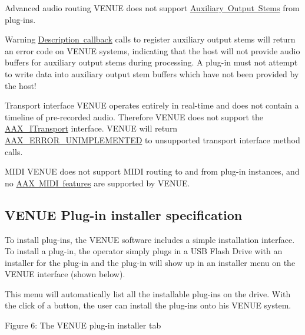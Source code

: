 
\begin{DoxyItemize}
\item Advanced audio routing  V\+E\+N\+UE does not support \mbox{\hyperlink{a00809}{Auxiliary Output Stems}} from plug-\/ins.

\begin{DoxyWarning}{Warning}
\mbox{\hyperlink{a00796}{Description callback}} calls to register auxiliary output stems will return an error code on V\+E\+N\+UE systems, indicating that the host will not provide audio buffers for auxiliary output stems during processing. A plug-\/in must not attempt to write data into auxiliary output stem buffers which have not been provided by the host!  
\end{DoxyWarning}

\item Transport interface  V\+E\+N\+UE operates entirely in real-\/time and does not contain a timeline of pre-\/recorded audio. Therefore V\+E\+N\+UE does not support the \mbox{\hyperlink{a01885}{A\+A\+X\+\_\+\+I\+Transport}} interface. V\+E\+N\+UE will return \mbox{\hyperlink{a00494_a5f8c7439f3a706c4f8315a9609811937a3b76994b32b97fcd56b19ef8032245df}{A\+A\+X\+\_\+\+E\+R\+R\+O\+R\+\_\+\+U\+N\+I\+M\+P\+L\+E\+M\+E\+N\+T\+ED}} to unsupported transport interface method calls.  
\item M\+I\+DI  V\+E\+N\+UE does not support M\+I\+DI routing to and from plug-\/in instances, and no \mbox{\hyperlink{a00806}{A\+AX M\+I\+DI features}} are supported by V\+E\+N\+UE.  
\end{DoxyItemize}



 \hypertarget{a00849_aax_venue_guide__installer}{}\subsection{V\+E\+N\+U\+E Plug-\/in installer specification}\label{a00849_aax_venue_guide__installer}
 To install plug-\/ins, the V\+E\+N\+UE software includes a simple installation interface. To install a plug-\/in, the operator simply plugs in a U\+SB Flash Drive with an installer for the plug-\/in and the plug-\/in will show up in an installer menu on the V\+E\+N\+UE interface (shown below).

 This menu will automatically list all the installable plug-\/ins on the drive. With the click of a button, the user can install the plug-\/ins onto his V\+E\+N\+UE system.

  Figure 6\+: The V\+E\+N\+UE plug-\/in installer tab

